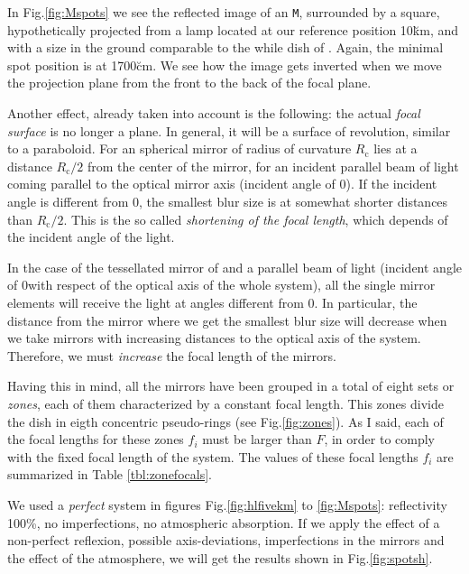 In Fig.\ref{fig:Mspots} we see the reflected image of an \texttt{M},
surrounded by a square, hypothetically projected from a lamp located
at our reference position 10\u{km}, and with a size in the ground
comparable to the while dish of \MAGIC. Again, the minimal spot
position is at 1700\u{cm}. We see how the image gets inverted when we
move the projection plane from the front to the back of the focal
plane.

Another effect, already taken into account is the following: the
actual \emph{focal surface} is no longer a plane. In general, it will
be a surface of revolution, similar to a paraboloid. For an spherical
mirror of radius of curvature $R_{\mathrm{c}}$ lies at a distance
$R_{\mathrm{c}}/2$ from the center of the mirror, for an incident
parallel beam of light coming parallel to the optical mirror axis
(incident angle of 0\deg).  If the incident angle is different from
0\deg, the smallest blur size is at somewhat shorter distances than
$R_{\mathrm{c}}/2$. This is the so called \emph{shortening of the
  focal length}, which depends of the incident angle of the light.

In the case of the tessellated mirror of \MAGIC and a parallel beam of
light (incident angle of 0\deg with respect of the optical axis of the
whole system), all the single mirror elements will receive the light
at angles different from 0\deg. In particular, the distance from the
mirror where we get the smallest blur size will decrease when we take
mirrors with increasing distances to the optical axis of the system.
Therefore, we must \emph{increase} the focal length of the mirrors. 

Having this in mind, all the mirrors have been grouped in a total of
eight sets or \emph{zones}, each of them characterized by a constant
focal length. This zones divide the dish in eigth concentric
pseudo-rings (see Fig.\ref{fig:zones}). As I said, each of the
focal lengths for these zones $f_i$ must be larger than $F$, in order
to comply with the fixed focal length of the system. The values of
these focal lengths $f_i$ are summarized in Table
\ref{tbl:zonefocals}.

\zonefocalstbl

\thetaspotsfig

\afterpage{\clearpage}

We used a \emph{perfect} system in figures Fig.\ref{fig:hlfivekm}
to \ref{fig:Mspots}: reflectivity 100\%, no imperfections, no
atmospheric absorption. If we apply the effect of a non-perfect
reflexion, possible axis-deviations, imperfections in the mirrors and
the effect of the atmosphere, we will get the results shown in
Fig.\ref{fig:spotsh}.

